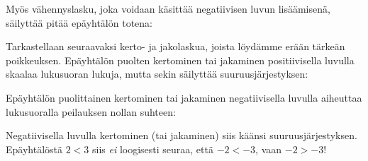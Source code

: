 Myös vähennyslasku, joka voidaan käsittää negatiivisen luvun lisäämisenä, säilyttää pitää epäyhtälön totena:

\begin{lukusuora}{-1}{10}{12}

\lukusuorauusi
\end{lukusuora}

Tarkastellaan seuraavaksi kerto- ja jakolaskua, joista löydämme erään tärkeän poikkeuksen. Epäyhtälön puolten kertominen tai jakaminen positiivisella luvulla skaalaa lukusuoran lukuja, mutta sekin säilyttää suuruusjärjestyksen:

\begin{lukusuora}{-1}{10}{12}

\lukusuorauusi
\end{lukusuora}

\begin{lukusuora}{-1}{10}{12}

\lukusuorauusi
\end{lukusuora}

Epäyhtälön puolittainen kertominen tai jakaminen negatiivisella luvulla aiheuttaa lukusuoralla peilauksen nollan suhteen:

\begin{lukusuora}{-6}{10}{6}

\lukusuorauusi
\end{lukusuora}

Negatiivisella luvulla kertominen (tai jakaminen) siis käänsi suuruusjärjestyksen.
Epäyhtälöstä $2<3$ siis \textit{ei} loogisesti seuraa, että $-2<-3$, vaan $-2>-3$!

